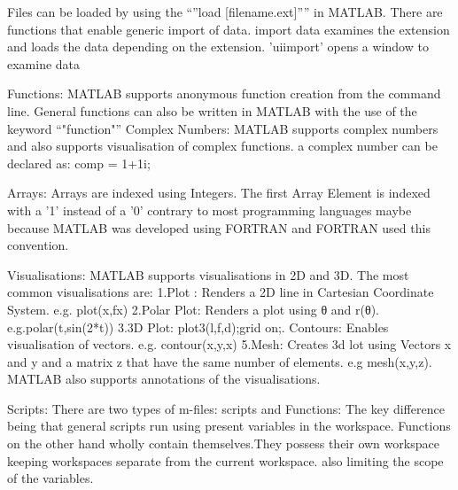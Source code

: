 \documentclass[fleqn,letterpaper,12pt]{report}
\begin{document}
Files can be loaded by using the “”load [filename.ext]”” in MATLAB. 
There are functions that enable generic import of data.
import data examines the extension and loads the data depending on the extension.\newline
'uiimport' opens a window to examine data

Functions:\newline
MATLAB supports anonymous function creation from the command line.\newline
General functions can also be written in MATLAB with the use of the keyword “"function"”
\newpage
Complex Numbers:\newline
MATLAB supports complex numbers and also supports visualisation of complex functions. a complex number can be declared as:\newline
comp = 1+1i;

Arrays:\newline
Arrays are indexed using Integers. The first Array Element is indexed with a '1' instead of a '0' contrary to most programming languages maybe because MATLAB was developed using FORTRAN and FORTRAN used this convention.

Visualisations:\cite{MATLAB}\newline
MATLAB supports visualisations in 2D and 3D.\newline
The most common visualisations are:\newline
1.Plot : Renders a 2D line in Cartesian Coordinate System. e.g. plot(x,fx)\newline
2.Polar Plot: Renders a plot using θ and r(θ). e.g.\newline polar(t,sin(2*t))\newline
3.3D Plot: plot3(l,f,d);grid on;. Contours: Enables visualisation of vectors. e.g. contour(x,y,x)
5.Mesh: Creates 3d lot using Vectors x and y and a matrix z that have the same number of elements. e.g mesh(x,y,z). MATLAB also supports annotations of the visualisations.

Scripts:\newline
There are two types of m-files:\newline
scripts and Functions:\newline
The key difference being that general scripts run using present variables in the workspace. Functions on the other hand wholly contain themselves.They possess their own workspace keeping workspaces separate from the current workspace. also limiting the scope of the variables.
\end{document}
